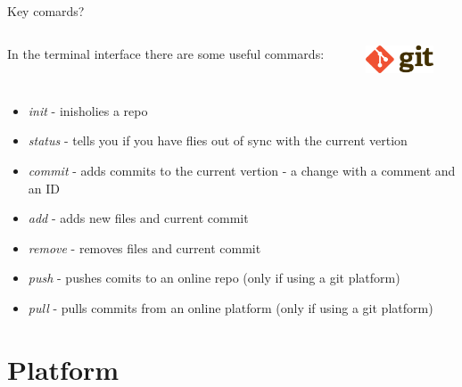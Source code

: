 \documentclass[10pt]{beamer}
\begin{document}
\begin{frame}[fragile]{Key comards?}
  \begin{columns}[T]
    \begin{column}{.8\textwidth}
	In the terminal interface there are some useful commards:
    \end{column}
    \begin{column}{.2\textwidth}
	\includegraphics[width=2cm]{Figs/Git-logo}
    \end{column}
  \end{columns}
	\begin{itemize}
		\item \textit{init} - inisholies a repo
		\item \textit{status} - tells you if you have flies out of sync with the current vertion
		\item \textit{commit} - adds commits to the current vertion - a change with a comment and an ID
		\item \textit{add} - adds new files and current commit
		\item \textit{remove} - removes files and current commit
		\item \textit{push} - pushes comits to an online repo (only if using a git platform)
		\item \textit{pull} - pulls commits from an online platform (only if using a git platform)
	\end{itemize}
\end{frame}



\section{Platform}
\end{document}
